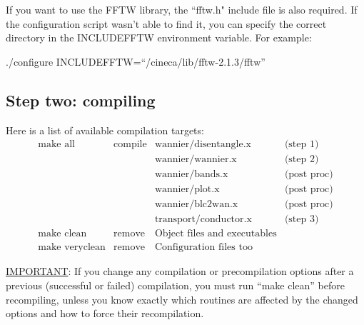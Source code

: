 \noindent If you want to use the FFTW library, the ``fftw.h"
include file is also required.  If the configuration script wasn't
able to find it, you can specify the correct directory in the
INCLUDEFFTW environment variable. For example:\

\begin{description}
  \item ./configure INCLUDEFFTW=``/cineca/lib/fftw-2.1.3/fftw''
\end{description}

\subsection{Step two: compiling}
\noindent Here is a list of available compilation targets:
\begin{displaymath}
\begin{array}{llll}
  \textrm{make all}        &  \textrm{compile} & \textrm{wannier/disentangle.x} &\textrm{(step 1)}\\
  \textrm{}                &  \textrm{}       & \textrm{wannier/wannier.x}     &\textrm{(step 2)}\\
  \textrm{}                &  \textrm{}       & \textrm{wannier/bands.x}       &\textrm{(post proc)}\\
  \textrm{}                &  \textrm{}       & \textrm{wannier/plot.x}        &\textrm{(post proc)}\\
  \textrm{}                &  \textrm{}       & \textrm{wannier/blc2wan.x}     &\textrm{(post proc)}\\
  \textrm{}                &  \textrm{}       & \textrm{transport/conductor.x} &\textrm{(step 3)}\\
  \textrm{make clean}      &  \textrm{remove}  & \textrm{Object files and
  executables}&  \textrm{}\\
    \textrm{make veryclean}      &  \textrm{remove}  & \textrm{Configuration files too}&  \textrm{}
\end{array}
\end{displaymath}

\noindent \underline {IMPORTANT}: If you change any compilation or
precompilation options after a previous (successful or failed)
compilation, you must run ``make clean'' before recompiling,
unless you know exactly which routines are affected by the changed
options and how to force their recompilation.

